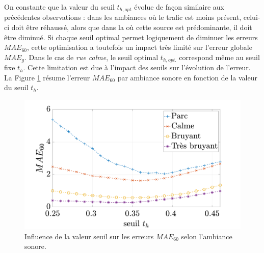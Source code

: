 \begin{table}[h]
\centering
\caption{Erreurs $MAE_{60}$ minimales selon le seuil optimal $t_{h,opt}$ par ambiance sonore.}
\label{tab:erreur_optimise}
\end{table}


On constante que la valeur du seuil $t_{h,opt}$ évolue de façon similaire aux précédentes observations : dans les ambiances où le trafic est moins présent, celui-ci doit être réhaussé, alors que dans la où cette source est prédominante, il doit être diminué.
Si chaque seuil optimal permet logiquement de diminuer les erreurs $MAE_{60}$, cette optimisation a toutefois un impact très limité sur l'erreur globale $MAE_g$. Dans le cas de \textit{rue calme}, le seuil optimal $t_{h,opt.}$ correspond même au seuil fixe $t_h$.
Cette limitation est due à l'impact des seuils sur l'évolution de l'erreur. La Figure \ref{fig:maeExpandSeuil} résume l'erreur $MAE_{60}$ par ambiance sonore en fonction de la valeur du seuil $t_h$. 
\begin{figure}[h]
 \centering
 \includegraphics[width=.7\linewidth]{./figures/resultats/maeExpandseuil.pdf}
 \caption{Influence de la valeur seuil sur les erreurs $MAE_{60}$ selon l'ambiance sonore.}
 \label{fig:maeExpandSeuil}
 \end{figure}
  

